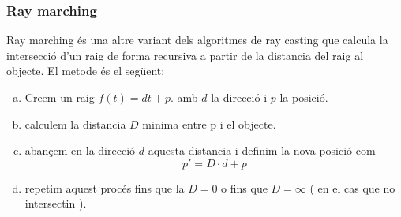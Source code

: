 \documentclass{article}
\begin{document}
\subsubsection{Ray marching}
Ray marching és una altre variant dels algoritmes de ray casting que calcula la intersecció d'un raig de forma recursiva a partir
de la distancia del raig al objecte.
El metode és el següent:
\begin{enumerate}[a)]
   \item Creem un raig $f(t)= dt+p$. amb  $d$ la direcció i  $p $ la posició.
    \item  calculem la distancia $D$ minima entre p i el objecte.
       \item abançem en la direcció $d$ aquesta distancia i definim  la nova posició com
          \begin{equation*}
              p'=D\cdot d+p
          \end{equation*}
       \item repetim aquest procés fins que la $D=0$ o fins que  $D= \infty$ ( en el cas que no intersectin ).
\end{enumerate}
\end{document}
